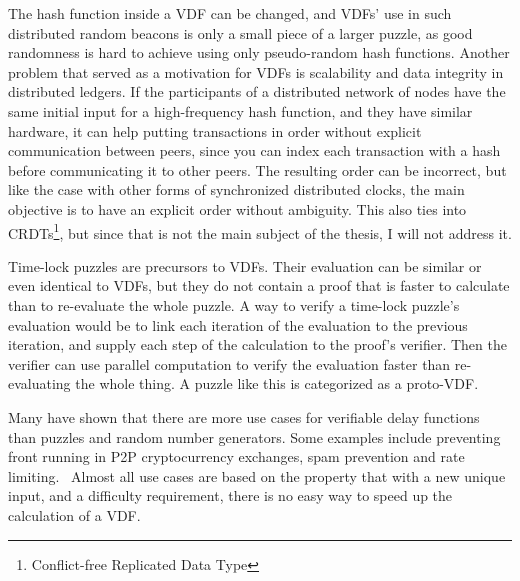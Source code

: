 The hash function inside a VDF can be changed, and VDFs' use in such distributed random beacons is only a small piece of a larger puzzle, as good randomness is hard to achieve using only pseudo-random hash functions. Another problem that served as a motivation for VDFs is scalability and data integrity in distributed ledgers. If the participants of a distributed network of nodes have the same initial input for a high-frequency hash function, and they have similar hardware, it can help putting transactions in order without explicit communication between peers, since you can index each transaction with a hash before communicating it to other peers. The resulting order can be incorrect, but like the case with other forms of synchronized distributed clocks, the main objective is to have an explicit order without ambiguity. This also ties into CRDTs\footnote{Conflict-free Replicated Data Type}, but since that is not the main subject of the thesis, I will not address it.

Time-lock puzzles are precursors to VDFs. Their evaluation can be similar or even identical to VDFs, but they do not contain a proof that is faster to calculate than to re-evaluate the whole puzzle. A way to verify a time-lock puzzle's evaluation would be to link each iteration of the evaluation to the previous iteration, and supply each step of the calculation to the proof's verifier. Then the verifier can use parallel computation to verify the evaluation faster than re-evaluating the whole thing. A puzzle like this is categorized as a proto-VDF.

Many have shown that there are more use cases for verifiable delay functions than puzzles and random number generators. Some examples include preventing front running in P2P cryptocurrency exchanges, spam prevention and rate limiting.~\cite{noauthor_undated-hk} Almost all use cases are based on the property that with a new unique input, and a difficulty requirement, there is no easy way to speed up the calculation of a VDF.

